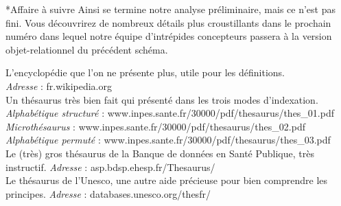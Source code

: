 \documentclass[a4paper, 12pt]{report}
\begin{document}
\begin{section}*{Affaire à suivre}
	Ainsi se termine notre analyse préliminaire, mais ce n'est pas fini.
	Vous découvrirez de nombreux détails plus croustillants dans le prochain numéro dans lequel notre équipe d'intrépides concepteurs passera
	à la version objet-relationnel du précédent schéma.
\end{section}

\renewcommand\bibname{Sitographie}%
\begin{thebibliography}{2}
	L'encyclopédie que l'on ne présente plus, utile pour les définitions.\\
	\emph{Adresse} : fr.wikipedia.org
	~\\
	Un thésaurus très bien fait qui présenté dans les trois modes d'indexation.\\
	\emph{Alphabétique structuré} : www.inpes.sante.fr/30000/pdf/thesaurus/thes\_01.pdf\\
	\emph{Microthésaurus} : www.inpes.sante.fr/30000/pdf/thesaurus/thes\_02.pdf\\
	\emph{Alphabétique permuté} : www.inpes.sante.fr/30000/pdf/thesaurus/thes\_03.pdf
	~\\
	Le (très) gros thésaurus de la Banque de données en Santé Publique, très instructif.
	\emph{Adresse} : asp.bdsp.ehesp.fr/Thesaurus/
	~\\
	Le thésaurus de l'Unesco, une autre aide précieuse pour bien comprendre les principes.
	\emph{Adresse} : databases.unesco.org/thesfr/
	~\\
\end{thebibliography}
\end{document}
